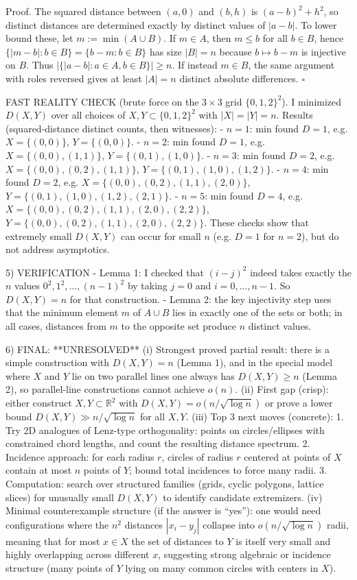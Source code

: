 Proof.
The squared distance between $(a,0)$ and $(b,h)$ is $(a-b)^2+h^2$, so distinct distances are determined exactly by distinct values of $|a-b|$.
To lower bound these, let $m:=\min(A\cup B)$.
If $m\in A$, then $m\le b$ for all $b\in B$, hence $\{|m-b|:b\in B\}=\{b-m:b\in B\}$ has size $|B|=n$ because $b\mapsto b-m$ is injective on $B$.
Thus $|\{|a-b|:a\in A,b\in B\}|\ge n$.
If instead $m\in B$, the same argument with roles reversed gives at least $|A|=n$ distinct absolute differences. $\square$

FAST REALITY CHECK (brute force on the $3\times 3$ grid $\{0,1,2\}^2$).
I minimized $D(X,Y)$ over all choices of $X,Y\subset\{0,1,2\}^2$ with $|X|=|Y|=n$. Results (squared-distance distinct counts, then witnesses):
- $n=1$: min found $D=1$, e.g. $X=\{(0,0)\}$, $Y=\{(0,0)\}$.
- $n=2$: min found $D=1$, e.g. $X=\{(0,0), (1,1)\}$, $Y=\{(0,1), (1,0)\}$.
- $n=3$: min found $D=2$, e.g. $X=\{(0,0), (0,2), (1,1)\}$, $Y=\{(0,1), (1,0), (1,2)\}$.
- $n=4$: min found $D=2$, e.g. $X=\{(0,0), (0,2), (1,1), (2,0)\}$, $Y=\{(0,1), (1,0), (1,2), (2,1)\}$.
- $n=5$: min found $D=4$, e.g. $X=\{(0,0), (0,2), (1,1), (2,0), (2,2)\}$, $Y=\{(0,0), (0,2), (1,1), (2,0), (2,2)\}$.
These checks show that extremely small $D(X,Y)$ can occur for small $n$ (e.g. $D=1$ for $n=2$), but do not address asymptotics.

5) VERIFICATION
- Lemma 1: I checked that $(i-j)^2$ indeed takes exactly the $n$ values $0^2,1^2,\ldots,(n-1)^2$ by taking $j=0$ and $i=0,\ldots,n-1$. So $D(X,Y)=n$ for that construction.
- Lemma 2: the key injectivity step uses that the minimum element $m$ of $A\cup B$ lies in exactly one of the sets or both; in all cases, distances from $m$ to the opposite set produce $n$ distinct values.

6) FINAL: **UNRESOLVED**
(i) Strongest proved partial result: there is a simple construction with $D(X,Y)=n$ (Lemma 1), and in the special model where $X$ and $Y$ lie on two parallel lines one always has $D(X,Y)\ge n$ (Lemma 2), so parallel-line constructions cannot achieve $o(n)$.
(ii) First gap (crisp): either construct $X,Y\subset\mathbb{R}^2$ with $D(X,Y)=o(n/\sqrt{\log n})$ or prove a lower bound $D(X,Y)\gg n/\sqrt{\log n}$ for all $X,Y$.
(iii) Top 3 next moves (concrete):
  1. Try 2D analogues of Lenz-type orthogonality: points on circles/ellipses with constrained chord lengths, and count the resulting distance spectrum.
  2. Incidence approach: for each radius $r$, circles of radius $r$ centered at points of $X$ contain at most $n$ points of $Y$; bound total incidences to force many radii.
  3. Computation: search over structured families (grids, cyclic polygons, lattice slices) for unusually small $D(X,Y)$ to identify candidate extremizers.
(iv) Minimal counterexample structure (if the answer is ``yes''): one would need configurations where the $n^2$ distances $|x_i-y_j|$ collapse into $o(n/\sqrt{\log n})$ radii, meaning that for most $x\in X$ the set of distances to $Y$ is itself very small and highly overlapping across different $x$, suggesting strong algebraic or incidence structure (many points of $Y$ lying on many common circles with centers in $X$).


